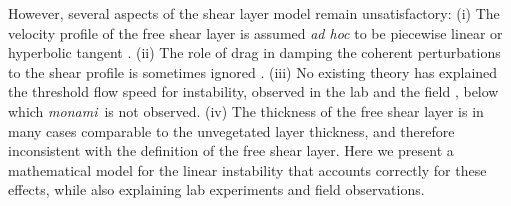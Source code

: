 \documentclass[aps,prl,twocolumn,superscriptaddress,sort&compress,10pt]{revtex4-1}  %
\newcommand{\monami}{\textit{monami}}
\begin{document}
However, several aspects of the shear layer model remain unsatisfactory: 
(i)   The velocity profile of the free shear layer is assumed \textit{ad hoc} to be piecewise linear \cite{Delangre06} or hyperbolic tangent \cite{Ghisal02,Raupach96}. 
(ii)  The role of drag in damping the coherent perturbations to the shear profile is sometimes ignored \cite{Raupach96}. 
(iii) No existing theory has explained the threshold flow speed for instability, observed in the lab \cite{Ghisal02} and the field \cite{Grizzle96}, below which \monami ~is not observed.
(iv)  The thickness of the free shear layer is in many cases comparable to the unvegetated layer thickness, and therefore inconsistent with the definition of the free shear layer.
Here we present a mathematical model for the linear instability that accounts correctly for these effects, while also explaining lab experiments and field observations.
\end{document}
